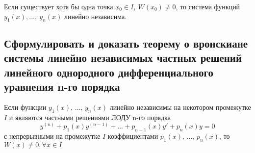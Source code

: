 \begin{assertion}
    Если существует хотя бы одна точка $x_0 \in I,\ W(x_0) \ne 0$, то система функций \break$y_1(x), \ldots,\ y_n(x)$ линейно независима.    
\end{assertion}

\subsection{Сформулировать и доказать теорему о вронскиане системы линейно независимых частных решений линейного однородного дифференциального уравнения n-го порядка}

\begin{theorem}
    Если функции $y_1(x),\, \ldots,\, y_n(x)$ линейно независимы  на некотором промежутке $I$ и являются частными решениями ЛОДУ n-го порядка
    \[
        y^{(n)} + p_1(x)y^{(n-1)} + \ldots + p_{n-1}(x) y' + p_n(x) y = 0
    \]
    с непрерывными на промежутке $I$ коэффициентами $p_1(x),\, \ldots,\, p_n(x)$, то $W(x) \ne 0,$\break $\forall x \in I$
\end{theorem}
